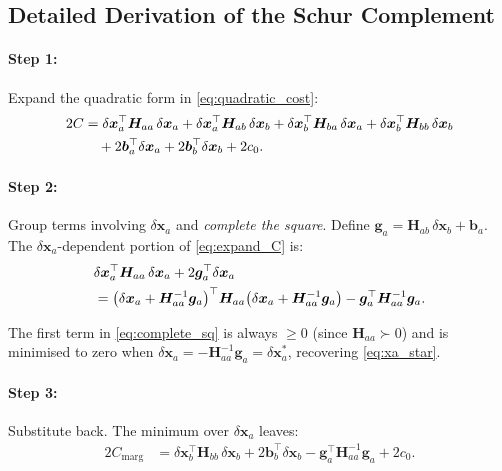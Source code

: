 \documentclass[11pt,a4paper]{article}
\newcommand{\bx}{\bm{x}}
\newcommand{\bb}{\bm{b}}
\newcommand{\bH}{\bm{H}}
\theoremstyle{definition}
\theoremstyle{plain}
\begin{document}
\subsection{Detailed Derivation of the Schur Complement}
\label{sec:schur_detail}

\paragraph{Step 1:} Expand the quadratic form in \eqref{eq:quadratic_cost}:
\begin{align}
  2C &= \delta\bx_a^\top \bH_{aa}\,\delta\bx_a
       + \delta\bx_a^\top \bH_{ab}\,\delta\bx_b
       + \delta\bx_b^\top \bH_{ba}\,\delta\bx_a
       + \delta\bx_b^\top \bH_{bb}\,\delta\bx_b \notag \\
     &\quad + 2\bb_a^\top \delta\bx_a
       + 2\bb_b^\top \delta\bx_b + 2c_0.
  \label{eq:expand_C}
\end{align}

\paragraph{Step 2:} Group terms involving $\delta\bx_a$ and
\emph{complete the square}.  Define
$\bm{g}_a = \bH_{ab}\,\delta\bx_b + \bb_a$.
The $\delta\bx_a$-dependent portion of \eqref{eq:expand_C} is:
\begin{align}
  &\delta\bx_a^\top \bH_{aa}\,\delta\bx_a
    + 2\bm{g}_a^\top \delta\bx_a \notag \\
  &= \bigl(\delta\bx_a + \bH_{aa}^{-1}\bm{g}_a\bigr)^\top
     \bH_{aa}
     \bigl(\delta\bx_a + \bH_{aa}^{-1}\bm{g}_a\bigr)
     - \bm{g}_a^\top \bH_{aa}^{-1} \bm{g}_a.
  \label{eq:complete_sq}
\end{align}

The first term in \eqref{eq:complete_sq} is always $\ge 0$ (since
$\bH_{aa} \succ 0$) and is minimised to zero when
$\delta\bx_a = -\bH_{aa}^{-1}\bm{g}_a = \delta\bx_a^*$,
recovering \eqref{eq:xa_star}.

\paragraph{Step 3:} Substitute back.  The minimum over $\delta\bx_a$ leaves:
\begin{align}
  2C_{\text{marg}} &= \delta\bx_b^\top \bH_{bb}\, \delta\bx_b
    + 2\bb_b^\top \delta\bx_b
    - \bm{g}_a^\top \bH_{aa}^{-1}\bm{g}_a + 2c_0.
\end{align}
\end{document}
